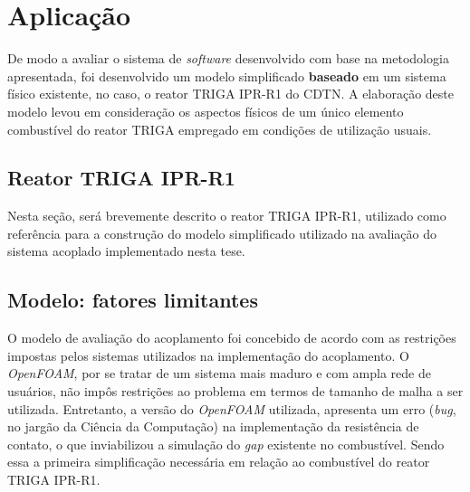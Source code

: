 \chapter{Aplicação}
\label{chap:aplicacao}

De modo a avaliar o sistema de \textit{software} desenvolvido com base na metodologia apresentada, 
foi desenvolvido um modelo simplificado \textbf{baseado} em um sistema físico existente, no caso,
o reator TRIGA IPR-R1 do CDTN. A elaboração deste modelo levou em consideração os aspectos físicos
de um único elemento combustível do reator TRIGA empregado em condições de utilização usuais.

\section{Reator TRIGA IPR-R1}
\label{sec:triga}

Nesta seção, será brevemente descrito o reator TRIGA IPR-R1, utilizado como referência para a
construção do modelo simplificado utilizado na avaliação do sistema acoplado implementado nesta
tese.


\section{Modelo: fatores limitantes}
\label{sec:lim}

O modelo de avaliação do acoplamento foi concebido de acordo com as restrições impostas pelos sistemas
utilizados na implementação do acoplamento. O \textit{OpenFOAM}, por se tratar de um sistema mais maduro
e com ampla rede de usuários, não impôs
restrições ao problema em termos de tamanho de malha a ser utilizada. Entretanto, a versão
do \textit{OpenFOAM} utilizada,
apresenta um erro (\textit{bug}, no jargão da Ciência da Computação) na implementação da resistência
de contato, o que inviabilizou a simulação do \textit{gap} existente no combustível. Sendo essa a
primeira simplificação necessária em relação ao combustível do reator TRIGA IPR-R1.

